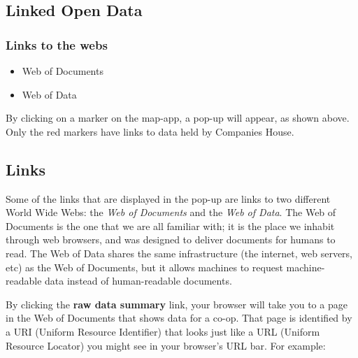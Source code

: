 \subsection{Linked Open Data}
\startslide
\frame
{
  \frametitle{Links to the webs}
  \begin{center}
  \end{center}
  \begin{itemize}
    \item Web of Documents
    \item Web of Data
  \end{itemize}
}
\slideend
By clicking on a marker on the map-app, a pop-up will appear, as shown above.
Only the red markers have links to data held by Companies House.

\subsection<article>{Links}

Some of the links that are displayed in the pop-up are links to two different World Wide Webs: the \textit{Web of Documents} and the \textit{Web of Data}.
The Web of Documents is the one that we are all familiar with; it is the place we inhabit through web browsers, and was designed to deliver documents for humans to read.
The Web of Data shares the same infrastructure (the internet, web servers, etc) as the Web of Documents, but it allows machines to request machine-readable data instead of human-readable documents.

\geek By clicking the \textbf{raw data summary} link, your browser will take you to a page in the Web of Documents that shows data for a co-op. 
That page is identified by a URI (Uniform Resource Identifier) that looks just like a URL (Uniform Resource Locator) you might see in your browser's URL bar. For example:


